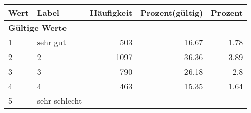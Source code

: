      \begin{longtable}{lXrrr}
     \toprule
     \textbf{Wert} & \textbf{Label} & \textbf{Häufigkeit} & \textbf{Prozent(gültig)} & \textbf{Prozent} \\
     \endhead
     \midrule
     \multicolumn{5}{l}{\textbf{Gültige Werte}}\\

     1 &
     \multicolumn{1}{X}{ sehr gut   } &


       \num{503} &
       \num[round-mode=places,round-precision=2]{16.67} &
         \num[round-mode=places,round-precision=2]{1.78} \\

     2 &
     \multicolumn{1}{X}{ 2   } &


       \num{1097} &
       \num[round-mode=places,round-precision=2]{36.36} &
         \num[round-mode=places,round-precision=2]{3.89} \\

     3 &
     \multicolumn{1}{X}{ 3   } &


       \num{790} &
       \num[round-mode=places,round-precision=2]{26.18} &
         \num[round-mode=places,round-precision=2]{2.8} \\

     4 &
     \multicolumn{1}{X}{ 4   } &


       \num{463} &
       \num[round-mode=places,round-precision=2]{15.35} &
         \num[round-mode=places,round-precision=2]{1.64} \\

     5 &
     \multicolumn{1}{X}{ sehr schlecht   } &



\end{longtable}
